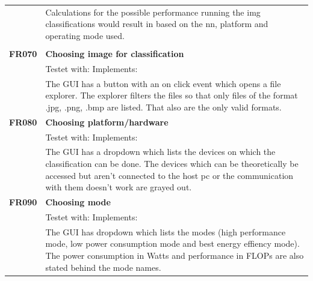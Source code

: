 \documentclass[parskip=full]{scrartcl}
\begin{document}
\begin{tabular}{p{2cm}p{12cm}}
& Calculations for the possible performance running the \gls{img} classifications would result in based on the \gls{nn}, platform and operating mode used.\\
& \\
\textbf{FR070} & \textbf{Choosing image for classification}\\
& Testet with: Implements: \\
& The GUI has a button with an on click event which opens a file explorer. The explorer filters the files so that only files of the format .jpg, .png, .bmp are listed. That also are the only valid formats.\\
\textbf{FR080} & \textbf{Choosing platform/hardware}\\
& Testet with: Implements: \\
& The GUI has a dropdown which lists the devices on which the classification can be done. The devices which can be theoretically be accessed but aren't connected to the host pc or the communication with them doesn't work are grayed out. \\
\textbf{FR090} & \textbf{Choosing mode}\\
& Testet with: Implements: \\
& The GUI has dropdown which lists the modes (high performance mode, low power consumption mode and best energy effiency mode). The power consumption in Watts and performance in FLOPs are also stated behind the mode names.
\end{tabular}
\end{document}
